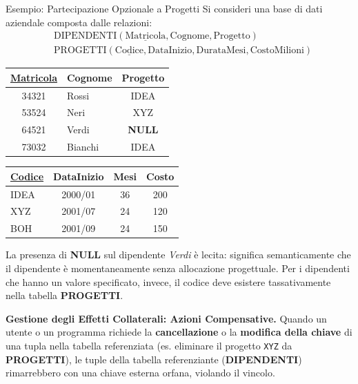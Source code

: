 \documentclass[12pt]{extarticle}
\begin{document}
\begin{cbox}{Esempio: Partecipazione Opzionale a Progetti}
\noindent Si consideri una base di dati aziendale composta dalle relazioni:
\begin{align*}
& \text{DIPENDENTI}(\underline{\text{Matricola}}, \text{Cognome}, \text{Progetto}) \\
& \text{PROGETTI}(\underline{\text{Codice}}, \text{DataInizio}, \text{DurataMesi}, \text{CostoMilioni})
\end{align*}
\begin{center}
\small
\begin{tabular}{clc}
    \toprule
    \textbf{\underline{Matricola}} & \textbf{Cognome} & \textbf{Progetto} \\
    \midrule
    34321 & Rossi & IDEA \\
    53524 & Neri & XYZ \\
    64521 & Verdi & \textbf{NULL} \\
    73032 & Bianchi & IDEA \\
    \bottomrule
\end{tabular}
\qquad
\begin{tabular}{lccc}
    \toprule
    \textbf{\underline{Codice}} & \textbf{DataInizio} & \textbf{Mesi} & \textbf{Costo} \\
    \midrule
    IDEA & 2000/01 & 36 & 200 \\
    XYZ & 2001/07 & 24 & 120 \\
    BOH & 2001/09 & 24 & 150 \\
    \bottomrule
\end{tabular}
\end{center}
\medskip
\noindent La presenza di \textbf{NULL} sul dipendente \textit{Verdi} è lecita: significa semanticamente che il dipendente è momentaneamente senza allocazione progettuale. Per i dipendenti che hanno un valore specificato, invece, il codice deve esistere tassativamente nella tabella \textbf{PROGETTI}.
\end{cbox}

\medskip
\noindent \textbf{Gestione degli Effetti Collaterali: Azioni Compensative.} Quando un utente o un programma richiede la \textbf{cancellazione} o la \textbf{modifica della chiave} di una tupla nella tabella referenziata (es. eliminare il progetto \texttt{XYZ} da \textbf{PROGETTI}), le tuple della tabella referenziante (\textbf{DIPENDENTI}) rimarrebbero con una chiave esterna orfana, violando il vincolo.
\end{document}
